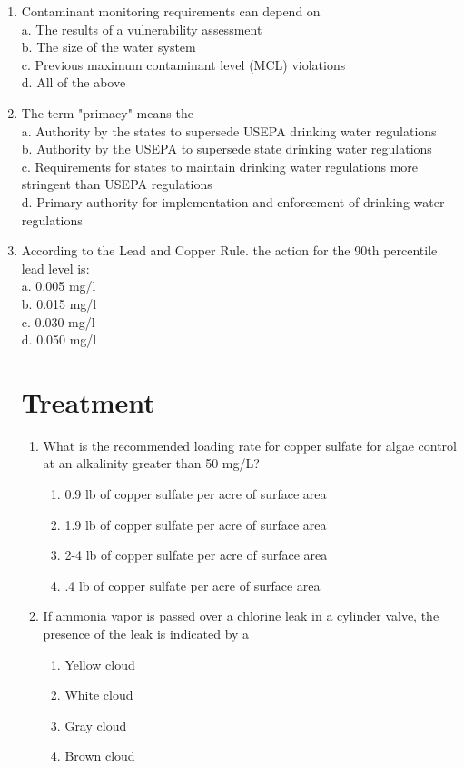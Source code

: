 \documentclass[10pt]{article}
\begin{document}
\begin{enumerate}
\item Contaminant monitoring requirements can depend on\\
a. The results of a vulnerability assessment\\
b. The size of the water system\\
c. Previous maximum contaminant level (MCL) violations\\
d. All of the above\\

\item The term "primacy" means the\\
a. Authority by the states to supersede USEPA drinking water regulations\\
b. Authority by the USEPA to supersede state drinking water regulations\\
c. Requirements for states to maintain drinking water regulations more stringent than USEPA regulations \\
d. Primary authority for implementation and enforcement of drinking water regulations\\

\item According to the Lead and Copper Rule. the action for the 90th percentile lead level is:\\
a. 0.005 mg/l\\
b. 0.015 mg/l\\
c. 0.030 mg/l\\
d. 0.050 mg/l\\

\newpage
\section{Treatment}

\begin{enumerate}
\item What is the recommended loading rate for copper sulfate for algae control at an alkalinity greater than 50 mg/L?
\begin{enumerate}
\item 0.9 lb of copper sulfate per acre of surface area
\item 1.9 lb of copper sulfate per acre of surface area
\item 2-4 lb of copper sulfate per acre of surface area
\item.4 lb of copper sulfate per acre of surface area
\end{enumerate}

\item If ammonia vapor is passed over a chlorine leak in a cylinder valve, the presence of the leak is indicated by a
\begin{enumerate}
\item Yellow cloud
\item White cloud
\item Gray cloud
\item Brown cloud
\end{enumerate}


\end{enumerate}
\end{enumerate}
\end{document}
